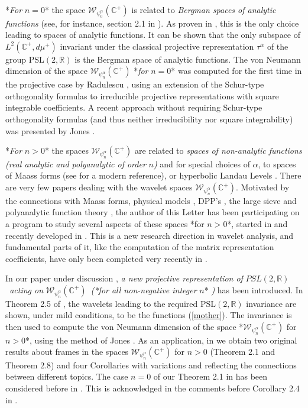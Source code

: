 \documentclass[11pt,reqno]{amsart}
\numberwithin{equation}{section}
\theoremstyle{plain}
\theoremstyle{definition}
\theoremstyle{remark}
\begin{document}
*\textsl{For }$n=0$* the space $\mathcal{W}_{\psi _{0}^{\alpha }}(\mathbb{C}%
^{+})$ is related to \emph{Bergman spaces of analytic functions} \cite{HKZ}
(see, for instance, section 2.1 in \cite{Fractal}). As proven in \cite%
{AnalyticWavelet}, this is the only choice leading to spaces of analytic
functions. It can be shown that the only subspace of $L^{2}(\mathbb{C}%
^{+},d\mu ^{+})$ invariant under the classical projective representation $%
\tau ^{\alpha }$ of the group $\mathrm{PSL}(2,\mathbb{R})$ is the Bergman
space of analytic functions. The von Neumann dimension of the space $%
\mathcal{W}_{\psi _{n}^{\alpha }}(\mathbb{C}^{+})$ *\textsl{for }$n=0$* was
computed for the first time in the projective case by Radulescu \cite[%
Section 3]{Radulescu}, using an extension of the Schur-type orthogonality
formulas to irreducible projective representations with square integrable
coefficients. A recent approach without requiring Schur-type orthogonality
formulas (and thus neither irreducibility nor square integrability) was
presented by Jones \cite{Jones}.

*\textsl{For }$n>0$* the spaces $\mathcal{W}_{\psi _{n}^{\alpha }}(\mathbb{C}%
^{+})$ are related to \emph{spaces of non-analytic functions (real analytic
and polyanalytic \cite{AF} of order }$n$\emph{) }and for special choices of $%
\alpha $, to spaces of Maass forms \cite{Maass} (see \cite{Duke} for a
modern reference), or hyperbolic Landau Levels \cite{Comtet,Mouayn,AoP}.
There are very few papers dealing with the wavelet spaces $\mathcal{W}_{\psi
_{n}^{\alpha }}(\mathbb{C}^{+})$. Motivated by the connections with Maass
forms, physical models \cite{AoP}, DPP's \cite{Ensemble}, the large sieve 
\cite{DL} and polyanalytic function theory \cite{AF}, the author of this
Letter has been participating on a program to study several aspects of these
spaces *for $n>0$*, started in \cite{AoP} and recently developed in \cite%
{DL,Ensemble,Affine}. This is a new research direction in wavelet analysis,
and fundamental parts of it, like the computation of the matrix
representation coefficients, have only been completed very recently in \cite%
{DL}.

In our paper under discussion \cite{Affine}, \emph{a new projective
representation of }$PSL(2,\mathbb{R})$\emph{\ acting on }$\mathcal{W}_{\psi
_{n}^{\alpha }}(\mathbb{C}^{+})$\emph{\ (*for all non-negative integer }$n$*%
\emph{)} has been introduced. In Theorem 2.5 of \cite{Affine}, the wavelets
leading to the required $\mathrm{PSL}(2,\mathbb{R})$ invariance are shown,
under mild conditions, to be the functions (\ref{mother}). The invariance is
then used to compute the von Neumann dimension of the space *$\mathcal{W}%
_{\psi _{n}^{\alpha }}(\mathbb{C}^{+})$ for $n>0$*, using the method of
Jones \cite{Jones}. As an application, in \cite{Affine} we obtain two
original results about frames in the spaces $\mathcal{W}_{\psi _{n}^{\alpha
}}(\mathbb{C}^{+})$ for $n>0$ (Theorem 2.1 and Theorem 2.8) and four
Corollaries with variations and reflecting the connections between different
topics. The case $n=0$ of our Theorem 2.1 in \cite{Affine} has been
considered before in \cite{Jordi}. This is acknowledged in the comments
before Corollary 2.4 in \cite{Affine}.
\end{document}
